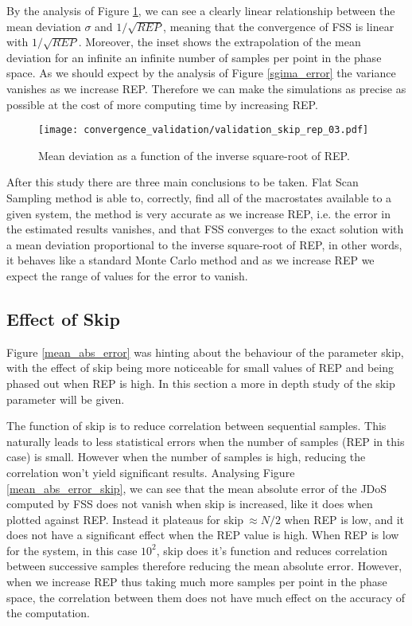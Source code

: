	By the analysis of Figure \ref{sigma_rep}, we can see a clearly linear relationship between the mean deviation $\sigma$ and $1/\sqrt{REP}$, meaning that the convergence of FSS is linear with $1/\sqrt{REP}$. Moreover, the inset shows the extrapolation of the mean deviation for an infinite an infinite number of samples per point in the phase space. As we should expect by the analysis of Figure \ref{sgima_error} the variance vanishes as we increase REP. Therefore we can make the simulations as precise as possible at the cost of more computing time by increasing REP.
	
\begin{figure}[h]
	\centering
	\texttt{[image: convergence\_validation/validation\_skip\_rep\_03.pdf]}
	\caption{Mean deviation as a function of the inverse square-root of REP.}
	\label{sigma_rep}
\end{figure}

	After this study there are three main conclusions to be taken. Flat Scan Sampling method is able to, correctly, find all of the macrostates available to a given system, the method is very accurate as we increase REP, i.e. the error in the estimated results vanishes, and that FSS converges to the exact solution with a mean deviation proportional to the inverse square-root of REP, in other words, it behaves like a standard Monte Carlo method and as we increase REP we expect the range of values for the error to vanish.
	
\subsection{Effect of Skip}

	Figure \ref{mean_abs_error} was hinting about the behaviour of the parameter skip, with the effect of skip being more noticeable for small values of REP and being phased out when REP is high. In this section a more in depth study of the skip parameter will be given.

	The function of skip is to reduce correlation between sequential samples. This naturally leads to less statistical errors when the number of samples (REP in this case) is small. However when the number of samples is high, reducing the correlation won't yield significant results. 
	Analysing Figure \ref{mean_abs_error_skip}, we can see that the mean absolute error of the JDoS computed by FSS does not vanish when skip is increased, like it does when plotted against REP. Instead it plateaus for skip$\ \approx N/2$ when REP is low, and it does not have a significant effect when the REP value is high. 
	When REP is low for the system, in this case $10^2$, skip does it's function and reduces correlation between successive samples therefore reducing the mean absolute error. However, when we increase REP thus taking much more samples per point in the phase space, the correlation between them does not have much effect on the accuracy of the computation. 
	
